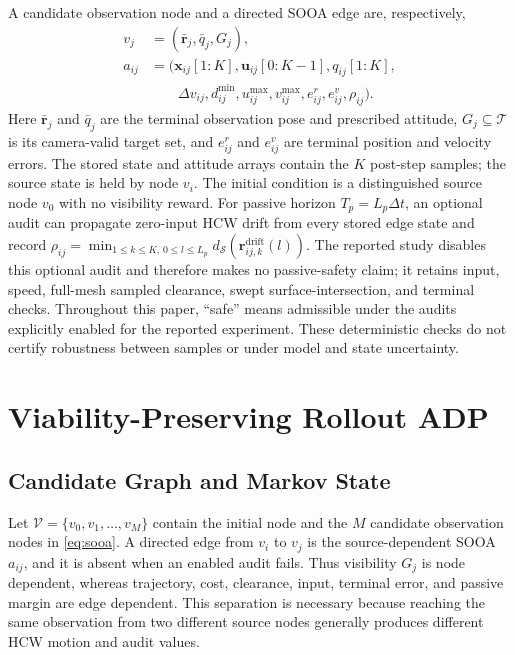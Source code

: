 \documentclass{IEEEtaes}
\newcommand{\dt}{\Delta t}
\theoremstyle{remark}
\theoremstyle{plain}
\begin{document}
A candidate observation node and a directed SOOA edge are, respectively,
\begin{equation}
  \begin{aligned}
  v_j&=(\bar{\mathbf r}_j,\bar q_j,G_j),\\
  a_{ij}&=\bigl(\mathbf x_{ij}[1{:}K],\mathbf u_{ij}[0{:}K-1],q_{ij}[1{:}K],\\
  &\qquad \Delta v_{ij},d_{ij}^{\min},u_{ij}^{\max},v_{ij}^{\max},e_{ij}^{r},e_{ij}^{v},\rho_{ij}\bigr).
  \end{aligned}
  \label{eq:sooa}
\end{equation}
Here $\bar{\mathbf r}_j$ and $\bar q_j$ are the terminal observation pose and prescribed attitude, $G_j\subseteq\mathcal T$ is its camera-valid target set, and $e_{ij}^{r}$ and $e_{ij}^{v}$ are terminal position and velocity errors. The stored state and attitude arrays contain the $K$ post-step samples; the source state is held by node $v_i$. The initial condition is a distinguished source node $v_0$ with no visibility reward. For passive horizon $T_p=L_p\dt$, an optional audit can propagate zero-input HCW drift from every stored edge state and record $\rho_{ij}=\min_{1\le k\le K,\,0\le l\le L_p}d_{\mathcal S}(\mathbf r_{ij,k}^{\mathrm{drift}}(l))$. The reported study disables this optional audit and therefore makes no passive-safety claim; it retains input, speed, full-mesh sampled clearance, swept surface-intersection, and terminal checks. Throughout this paper, ``safe'' means admissible under the audits explicitly enabled for the reported experiment. These deterministic checks do not certify robustness between samples or under model and state uncertainty.

\section{Viability-Preserving Rollout ADP}
\label{sec:algorithm}

\subsection{Candidate Graph and Markov State}

Let $\mathcal V=\{v_0,v_1,\ldots,v_M\}$ contain the initial node and the $M$ candidate observation nodes in \eqref{eq:sooa}. A directed edge from $v_i$ to $v_j$ is the source-dependent SOOA $a_{ij}$, and it is absent when an enabled audit fails. Thus visibility $G_j$ is node dependent, whereas trajectory, cost, clearance, input, terminal error, and passive margin are edge dependent. This separation is necessary because reaching the same observation from two different source nodes generally produces different HCW motion and audit values.
\end{document}
